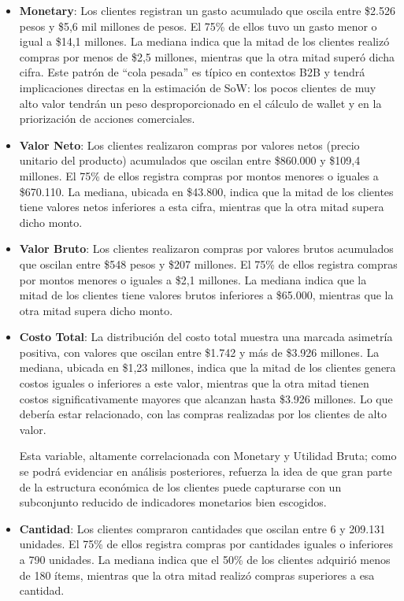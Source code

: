 \begin{itemize}
    \item \textbf{Monetary}: Los clientes registran un gasto acumulado que oscila entre \$2.526 pesos y \$5,6 mil millones de pesos. El 75\% de ellos tuvo un gasto menor o igual a \$14,1 millones. La mediana indica que la mitad de los clientes realizó compras por menos de \$2,5 millones, mientras que la otra mitad superó dicha cifra. Este patrón de “cola pesada” es típico en contextos B2B y tendrá implicaciones directas en la estimación de SoW: los pocos clientes de muy alto valor tendrán un peso desproporcionado en el cálculo de wallet y en la priorización de acciones comerciales.
    
    \item \textbf{Valor Neto}: Los clientes realizaron compras por valores netos (precio unitario del producto) acumulados que oscilan entre \$860.000 y \$109,4 millones. El 75\% de ellos registra compras por montos menores o iguales a \$670.110. La mediana, ubicada en \$43.800, indica que la mitad de los clientes tiene valores netos inferiores a esta cifra, mientras que la otra mitad supera dicho monto.
    
    \item \textbf{Valor Bruto}: Los clientes realizaron compras por valores brutos acumulados que oscilan entre \$548 pesos y \$207 millones. El 75\% de ellos registra compras por montos menores o iguales a \$2,1 millones. La mediana indica que la mitad de los clientes tiene valores brutos inferiores a \$65.000, mientras que la otra mitad supera dicho monto. 
    
    \item \textbf{Costo Total}: La distribución del costo total muestra una marcada asimetría positiva, con valores que oscilan entre \$1.742 y más de \$3.926 millones. La mediana, ubicada en \$1,23 millones, indica que la mitad de los clientes genera costos iguales o inferiores a este valor, mientras que la otra mitad tienen costos significativamente mayores que alcanzan hasta \$3.926 millones. Lo que debería estar relacionado, con las compras realizadas por los clientes de alto valor. 
    
    Esta variable, altamente correlacionada con Monetary y Utilidad Bruta; como se podrá evidenciar en análisis posteriores,  refuerza la idea de que gran parte de la estructura económica de los clientes puede capturarse con un subconjunto reducido de indicadores monetarios bien escogidos. 
    
    \item \textbf{Cantidad}: Los clientes compraron cantidades que oscilan entre 6 y 209.131 unidades. El 75\% de ellos registra compras por cantidades iguales o inferiores a 790 unidades. La mediana indica que el 50\% de los clientes adquirió menos de 180 ítems, mientras que la otra mitad realizó compras superiores a esa cantidad. 
    

\end{itemize}
